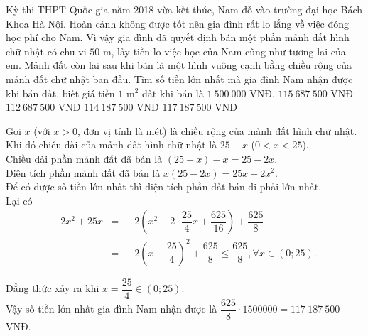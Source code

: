 \begin{ex}%
 Kỳ thi THPT Quốc gia năm 2018 vừa kết thúc, Nam đỗ vào trường đại học Bách Khoa Hà Nội. Hoàn cảnh không được tốt nên gia đình rất lo lắng về việc đóng học phí cho Nam. Vì vậy gia đình đã quyết định bán một phần mảnh đất hình chữ nhật có chu vi $50$ m, lấy tiền lo việc học của Nam cũng như tương lai của em. Mảnh đất còn lại sau khi bán là một hình vuông cạnh bằng chiều rộng của mảnh đất chữ nhật ban đầu. Tìm số tiền lớn nhất mà gia đình Nam nhận được khi bán đất, biết giá tiền $1$ m$^2$ đất khi bán là $1\ 500\ 000$ VNĐ.
 \choice
  {$115\ 687\ 500$ VNĐ}
  {$112\ 687\ 500$ VNĐ}
  {$114\ 187\ 500$ VNĐ}
  {\True $117\ 187\ 500$ VNĐ}
 \loigiai
  {
  \immini
  {
  Gọi $x$ (với $x>0$, đơn vị tính là mét) là chiều rộng của mảnh đất hình chữ nhật. Khi đó chiều dài của mảnh đất hình chữ nhật là $25-x$ ($0<x<25$).\\
  Chiều dài phần mảnh đất đã bán là $(25-x)-x=25-2x$.\\
  Diện tích phần mảnh đất đã bán là $x(25-2x)=25x-2x^2$.\\
  Để có được số tiền lớn nhất thì diện tích phần đất bán đi phải lớn nhất.\\
  Lại có
  \allowdisplaybreaks
  \begin{eqnarray*}
   -2x^2+25x &=& -2\left(x^2-2\cdot \dfrac{25}{4}x+\dfrac{625}{16}\right)+\dfrac{625}{8}\\
   &=& -2\left(x-\dfrac{25}{4}\right)^2+\dfrac{625}{8} \leq \dfrac{625}{8}, \forall x\in(0;25).
  \end{eqnarray*}
  }
  {
  }
  \noindent
  Đẳng thức xảy ra khi $x=\dfrac{25}{4}\in(0;25)$.\\
  Vậy số tiền lớn nhất gia đình Nam nhận được là $\dfrac{625}{8}\cdot 1500000 = 117\ 187\ 500$ VNĐ.
  }
\end{ex}

